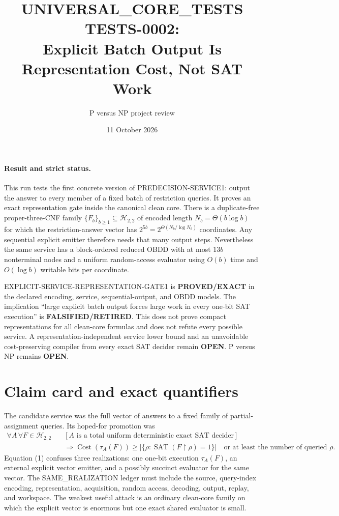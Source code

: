 \documentclass[11pt]{article}
\title{UNIVERSAL\_CORE\_TESTS TESTS-0002:\\
Explicit Batch Output Is Representation Cost, Not SAT Work}
\author{P versus NP project review}
\date{11 October 2026}
\begin{document}
\maketitle

\paragraph{Result and strict status.}
This run tests the first concrete version of \textsf{PREDECISION-SERVICE1}:
output the answer to every member of a fixed batch of restriction queries.
It proves an exact representation gate inside the canonical clean core.
There is a duplicate-free proper-three-CNF family
$\{F_b\}_{b\ge1}\subseteq\mathcal H_{2,2}$ of encoded length
$N_b=\Theta(b\log b)$ for which the restriction-answer vector has
$2^{5b}=2^{\Theta(N_b/\log N_b)}$ coordinates.  Any sequential explicit
emitter therefore needs that many output steps.  Nevertheless the same
service has a block-ordered reduced OBDD with at most $13b$ nonterminal
nodes and a uniform random-access evaluator using $O(b)$ time and
$O(\log b)$ writable bits per coordinate.

\textsf{EXPLICIT-SERVICE-REPRESENTATION-GATE1} is
\textbf{PROVED/EXACT} in the declared encoding, service, sequential-output,
and OBDD models.  The implication ``large explicit batch output forces large
work in every one-bit SAT execution'' is \textbf{FALSIFIED/RETIRED}.  This
does not prove compact representations for all clean-core formulas and does
not refute every possible service.  A representation-independent service
lower bound and an unavoidable cost-preserving compiler from every exact SAT
decider remain \textbf{OPEN}.  P versus NP remains \textbf{OPEN}.

\section{Claim card and exact quantifiers}
The candidate service was the full vector of answers to a fixed family of
partial-assignment queries.  Its hoped-for promotion was
\[
\begin{split}
\forall A\,\forall F\in\mathcal H_{2,2}\quad
 &[A\text{ is a total uniform deterministic exact SAT decider}]\\
 &\Longrightarrow
 \operatorname{Cost}(\tau_A(F))\ge
 \bigl|\{\rho:\operatorname{SAT}(F\upharpoonright\rho)=1\}\bigr|
 \quad\text{or at least the number of queried }\rho .
\end{split}                                                     \tag{1}
\]
Equation (1) confuses three realizations: one one-bit execution
$\tau_A(F)$, an external explicit vector emitter, and a possibly succinct
evaluator for the same vector.  The SAME\_REALIZATION ledger must include
the source, query-index encoding, representation, acquisition, random
access, decoding, output, replay, and workspace.  The weakest useful attack
is an ordinary clean-core family on which the explicit vector is enormous
but one exact shared evaluator is small.
\end{document}
